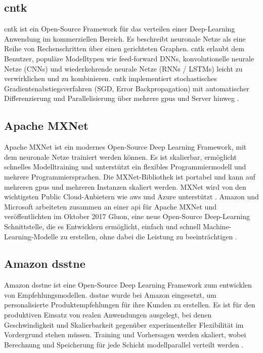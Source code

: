 \subsection{\acf{cntk}}
\ac{cntk} ist ein Open-Source Framework für das verteilen einer Deep-Learning Anwendung im kommerziellen Bereich. Es beschreibt neuronale Netze als eine Reihe von Rechenschritten über einen gerichteten Graphen. \ac{cntk} erlaubt dem Benutzer, populäre Modelltypen wie feed-forward DNNs, konvolutionelle neurale Netze (CNNs) und wiederkehrende neurale Netze (RNNs / LSTMs) leicht zu verwirklichen und zu kombinieren. \ac{cntk} implementiert stochastisches Gradientenabstiegsverfahren (SGD, Error Backpropagation) mit automatischer Differenzierung und Parallelisierung über mehrere \ac{gpu}s und Server hinweg \cite{CNTK}.

\subsection{Apache MXNet}
Apache MXNet ist ein modernes Open-Source Deep Learning Framework, mit dem neuronale Netze trainiert werden können. Es ist skalierbar, ermöglicht schnelles Modelltraining und unterstützt ein flexibles Programmiermodell und mehrere Programmiersprachen. Die MXNet-Bibliothek ist portabel und kann auf mehreren \ac{gpu}s und mehreren Instanzen skaliert werden. MXNet wird von den wichtigsten Public Cloud-Anbietern wie \ac{aws} und Azure unterstützt \cite{WikipediaApacheMXNet}. Amazon und Microsoft arbeiteten zusammen an einer \ac{api} für Apache MXNet und veröffentlichten im Oktober 2017 Gluon, eine neue Open-Source Deep-Learning Schnittstelle, die es Entwicklern ermöglicht, einfach und schnell Machine-Learning-Modelle zu erstellen, ohne dabei die Leistung zu beeinträchtigen \cite{AWSintroducingGluon}.

\subsection{Amazon \acs{dsstne}}
Amazon \ac{dsstne} ist eine Open-Source Deep Learning Framework zum entwicklen von Empfehlungsmodellen. \ac{dsstne} wurde bei Amazon eingesetzt, um personalisierte Produktempfehlungen für ihre Kunden zu erstellen. Es ist für den produktiven Einsatz von realen Anwendungen ausgelegt, bei denen Geschwindigkeit und Skalierbarkeit gegenüber experimenteller Flexibilität im Vordergrund stehen müssen. Training und Vorhersagen werden skaliert, wobei Berechnung und Speicherung für jede Schicht modellparallel verteilt werden \cite{Amazon DSSTNE}.


